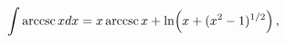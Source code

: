 \[\int\mathop{\mathrm{arccsc}\/}\nolimits xdx=x\mathop{\mathrm{arccsc}\/}%
\nolimits x+\mathop{\ln\/}\nolimits\!\left(x+(x^{2}-1)^{1/2}\right),\]